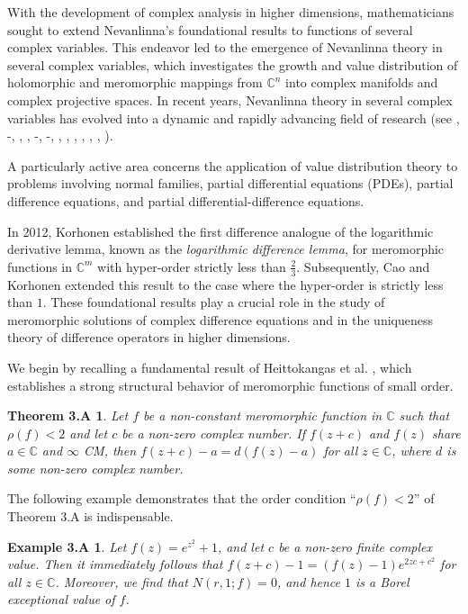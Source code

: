 \documentclass[11pt,reqno]{amsart}
\newtheorem*{theo3A}{Theorem 3.A}
\newtheorem*{exm3A}{Example 3.A}
\numberwithin{equation}{section}
\begin{document}
\smallskip

With the development of complex analysis in higher dimensions, mathematicians sought to extend Nevanlinna's foundational results to functions of several complex variables. This endeavor led to the emergence of Nevanlinna theory in several complex variables, which investigates the growth and value distribution of holomorphic and meromorphic mappings from $\mathbb{C}^n$ into complex manifolds and complex projective spaces. 
In recent years, Nevanlinna theory in several complex variables has evolved into a dynamic and rapidly advancing field of research (see \cite{BM}, \cite{ck}-\cite{CLL}, \cite{PVD2}, \cite{HZ1}, \cite{Korhonen-2012}-\cite{LS1}, \cite{FL1}-\cite{FL}, \cite{Liu-Zhang-2018}, \cite{MD1}, \cite{MDP}, \cite{MS}, \cite{MS1}, \cite{MSP}, \cite{Wang-Liu-2023}). 

A particularly active area concerns the application of value distribution theory to problems involving normal families, partial differential equations (PDEs), partial difference equations, and partial differential-difference equations. 


In 2012, Korhonen \cite{Korhonen-2012} established the first difference analogue of the logarithmic derivative lemma, known as the \emph{logarithmic difference lemma}, for meromorphic functions in $\mathbb{C}^m$ with hyper-order strictly less than $\frac{2}{3}$. Subsequently, Cao and Korhonen \cite{ck} extended this result to the case where the hyper-order is strictly less than $1$. These foundational results play a crucial role in the study of meromorphic solutions of complex difference equations and in the uniqueness theory of difference operators in higher dimensions.

We begin by recalling a fundamental result of Heittokangas et al. \cite{Heittokangas-Korhonen-Laine-Rieppo-Zhang-2009}, which establishes a strong structural behavior of meromorphic functions of small order. 
\begin{theo3A} \cite[Theorem 1]{Heittokangas-Korhonen-Laine-Rieppo-Zhang-2009} Let $f$ be a non-constant meromorphic function in $\mathbb{C}$ such that $\rho(f)<2$ and let $c$ be a non-zero complex number. If $f(z+c)$ and $f(z)$ share $a\in\mathbb{C}$ and $\infty$ CM, then $f(z+c)-a=d(f(z)-a)$ for all $z\in\mathbb{C}$, where $d$ is some non-zero complex number.
\end{theo3A}
The following example demonstrates that the order condition ``$\rho(f)<2$'' of Theorem 3.A is indispensable.
\begin{exm3A}\cite{Heittokangas-Korhonen-Laine-Rieppo-Zhang-2009} Let $f(z)=e^{z^{2}} + 1$, and let $c$ be a non-zero finite complex value. Then it immediately follows that $f(z+c)-1=(f(z)-1)e^{2zc+c^{2}}$ for all $z \in \mathbb{C}$. Moreover, we find that
$N(r,1;f)=0$, and hence $1$ is a Borel exceptional value of $f$.
\end{exm3A}
\end{document}
